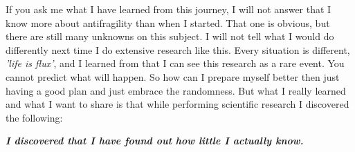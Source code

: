If you ask me what I have learned from this journey, I will not answer that I know more about \gls{antifragility} than when I started. That one is obvious, but there are still many unknowns on this subject. I will  not tell what I would do differently next time I do extensive research like this. Every situation is different, \textit{'life is flux'}, and I learned from \textcite{Taleb2012} that I can see this research as a rare event. You cannot predict what will happen. So how can I prepare myself better then just having a good plan and just embrace the randomness. But what I really learned and what I want to share is that while performing scientific research I discovered the following:\\

\vspace{\baselineskip}
\begin{center}
\noindent \textit{\textbf{I discovered that I have found out how little I actually know.}}
\end{center}